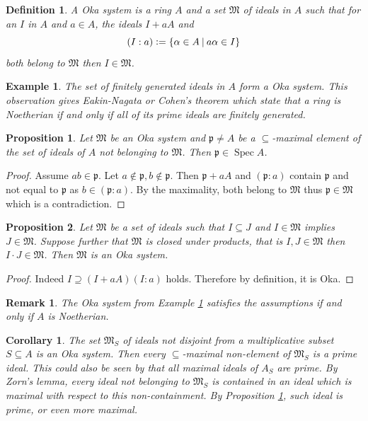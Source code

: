 \documentclass[8pt]{article}
\numberwithin{equation}{section}
\newtheorem{proposition}{Proposition}[subsection]
\newtheorem{definition}{Definition}[subsection]
\newtheorem{remark}{Remark}[subsection]
\newtheorem{corollary}{Corollary} [subsection]
\newtheorem{example}{Example}[subsection]
\DeclareMathOperator{\Spec}{Spec}
\newcommand{\defeq}{\vcentcolon=}
\newcommand{\sep}[0]{\:|\:}
\newcommand{\p}[0]{\mathfrak{p}}
\begin{document}
\begin{definition}
    \label{definition_12_3}
    A Oka system is a ring $A$ and a set $\mathfrak{M}$ of ideals in $A$ such that for an $I$ in $A$ and $a\in A$, the ideals $I+aA$ and 
    \begin{equation*}
        (I:a) \defeq \{\alpha\in A\sep a\alpha\in I\}
    \end{equation*}
    both belong to $\mathfrak{M}$ then $I\in\mathfrak{M}$.
\end{definition}
\begin{example}
    \label{example_12_2}
    The set of finitely generated ideals in $A$ form a Oka system. This observation gives Eakin-Nagata or Cohen's theorem which state that a ring is Noetherian if and only if all of its prime ideals are finitely generated.%
\end{example}
\begin{proposition}
    \label{proposition_12_1}
    Let $\mathfrak{M}$ be an Oka system and $\p\not=A$ be a $\subseteq$-maximal element of the set of ideals of $A$ not belonging to $\mathfrak{M}$. Then $\p\in\Spec A$. 
\end{proposition}
\begin{proof}
    Assume $ab\in\p$. Let $a\not\in \p,b\not\in\p$. Then $\p+aA$ and $(\p:a)$
    contain $\p$ and not equal to $\p$ as $b\in(\p:a)$. By the maximality, both belong to $\mathfrak{M}$ thus $\p\in\mathfrak{M}$ which is a contradiction.
\end{proof}
\begin{proposition}
    \label{fact_12_3}
    Let $\mathfrak{M}$ be a set of ideals such that $I\subseteq J$ and $I\in\mathfrak{M}$ implies $J\in\mathfrak{M}$. Suppose further that $\mathfrak{M}$ is closed under products, that is $I,J\in\mathfrak{M}$ then $I\cdot J\in\mathfrak{M}$. Then $\mathfrak{M}$ is an Oka system.
\end{proposition}
\begin{proof}
    Indeed $I\supseteq (I+aA)(I:a)$ holds. Therefore by definition, it is Oka.
\end{proof}
\begin{remark}
    The Oka system from Example \ref{example_12_2} satisfies the assumptions if and only if $A$ is Noetherian.
\end{remark}
\begin{corollary}
    \label{corollary_12_3}
    The set $\mathfrak{M}_S$ of ideals not disjoint from a multiplicative subset $S\subseteq A$ is an Oka system. Then every $\subseteq$-maximal non-element of $\mathfrak{M}_S$ is a prime ideal. This could also be seen by that all maximal ideals of $A_S$ are prime. By Zorn's lemma, every ideal not belonging to $\mathfrak{M}_S$ is contained in an ideal which is maximal with respect to this non-containment. %
    By Proposition \ref{proposition_12_1}, such ideal is prime, or even more maximal.
\end{corollary}
\end{document}
